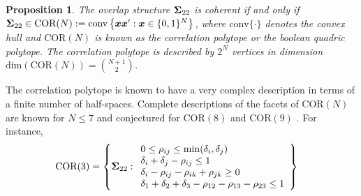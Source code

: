 \documentclass[12pt]{article}
\newcommand{\COR}{\text{COR}}
\newtheorem{proposition}[theorem]{Proposition}
\theoremstyle{definition}
\theoremstyle{definition}
\def\conv{\text{conv}}
\begin{document}
\begin{proposition}
\label{CorrelationPolytope}
The overlap structure ${\bf\Sigma}_{22}$ is coherent if and only
if 
${\bf\Sigma}_{22} \in \COR(N) := \conv\left\{
\boldsymbol{x}\boldsymbol{x}' : \boldsymbol{x} \in
\{0,1\}^N\right\}$,
where $\conv\{\cdot\}$ denotes the convex hull and $\COR(N)$ is known as the correlation
polytope or the boolean quadric polytope. The correlation polytope is described by $2^N$
vertices in dimension $\text{dim}(\COR(N)) = \binom{N+1}{2}$.
\end{proposition}
The correlation polytope is known to have a very complex description in terms of a finite
number of half-spaces. Complete descriptions of the facets of $\COR(N)$ are known for $N \leq 7$ and conjectured for  $\COR(8)$ and $\COR(9)$ \citep{ziegler2000lectures, christofsmapo, pitowsky1991correlation}. For instance, 
\begin{align*}
\COR(3) &= 
\left\{ {\bf\Sigma}_{22} : 
\begin{array}{ll}
 0 \leq \rho_{ij} \leq \min(\delta_i, \delta_j)\\
 \delta_i + \delta_j - \rho_{ij} \leq 1\\
 \delta_i - \rho_{ij} - \rho_{ik} + \rho_{jk} \geq 0\\
 \delta_1 + \delta_2 + \delta_3 - \rho_{12} - \rho_{13} - \rho_{23} \leq 1
\end{array}
\right\}
\end{align*}
\end{document}
